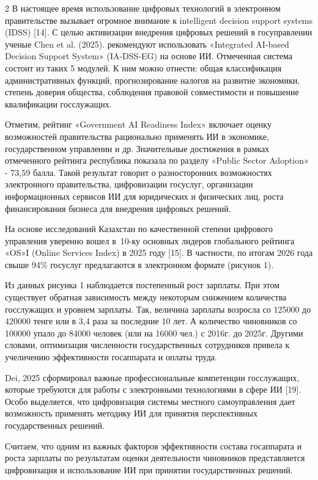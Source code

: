 \begin{multicols}{2}
В настоящее время использование цифровых технологий в электронном
правительстве вызывает огромное внимание к intelligent decision support
systems (IDSS) {[}14{]}. С целью активизации внедрения цифровых решений
в госуправлении ученые Chen et al. (2025). рекомендуют использовать
«Integrated AI-based Decision Support System» (IA-DSS-EG) на основе ИИ.
Отмеченная система состоит из таких 5 модулей. К ним можно отнести:
общая классификация административных функций, прогнозирование налогов на
развитие экономики, степень доверия общества, соблюдения правовой
совместимости и повышение квалификации госслужащих.

Отметим, рейтинг «Government AI Readiness Index» включает оценку
возможностей правительства рационально применять ИИ в экономике,
государственном управлении и др. Значительные достижения в рамках
отмеченного рейтинга республика показала по разделу «Public Sector
Adoption» - 73,59 балла. Такой результат говорит о разносторонних
возможностях электронного правительства, цифровизации госуслуг,
организации информационных сервисов ИИ для юридических и физических лиц,
роста финансирования бизнеса для внедрения цифровых решений.

На основе исследований Казахстан по качественной степени цифрового
управления уверенно вошел в~10-ку основных лидеров глобального рейтинга
«OS»I (Online Services Index) в 2025 году {[}15{]}. В частности, по
итогам 2026 года свыше 94\% госуслуг предлагаются в электронном формате
(рисунок 1).

Из данных рисунка 1 наблюдается постепенный рост зарплаты. При этом
существует обратная зависимость между некоторым снижением количества
госслужащих и уровнем зарплаты. Так, величина зарплаты возросла со
125000 до 420000 тенге или в 3,4 раза за последние 10 лет. А количество
чиновников со 100000 упало до 84000 человек (или на 16000 чел.) с 2016г.
до 2025г. Другими словами, оптимизация численности государственных
сотрудников привела к учеличению эффективности госаппарата и оплаты
труда.

Dei, 2025 сформировал важные профессиональные компетенции госслужащих,
которые требуются для работы с электронными технологиями в сфере ИИ
{[}19{]}. Особо выделяется, что цифровизация системы местного
самоуправления дает возможность применять методику ИИ для принятия
перспективных государственных решений.

Считаем, что одним из важных факторов эффективности состава госаппарата
и роста зарплаты по результатам оценки деятельности чиновников
представляется цифровизация и использование ИИ при принятии
государственных решений.
\end{multicols}

